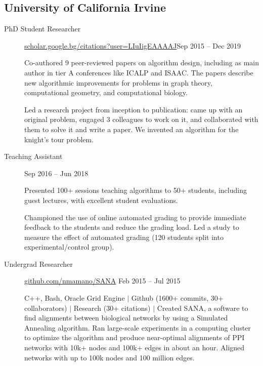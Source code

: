 \documentclass[letterpaper,10pt,oneside]{article}
\begin{document}
\subsection*{University of California Irvine}
\vspace{-3px}
\begin{description}
\item[PhD Student Researcher]\quad \href{https://scholar.google.bg/citations?hl=en&user=LIuIigEAAAAJ}{scholar.google.bg/citations?user=LIuIigEAAAAJ}\hfill Sep 2015 -- Dec 2019

Co-authored 9 peer-reviewed papers on algorithm design, including as main author in tier A conferences like ICALP and ISAAC. The papers describe new algorithmic improvements for problems in graph theory, computational geometry, and computational biology. %

\vspace{2px}
\noindent Led a research project from inception to publication: came up with an original problem, engaged 3 colleagues to work on it, and collaborated with them to solve it and write a paper. We invented an algorithm for the knight's tour problem.

\item[Teaching Assistant] \hfill Sep 2016 -- Jun 2018

Presented 100+ sessions teaching algorithms to 50+ students, including guest lectures, with excellent student evaluations.

\vspace{2px}
Championed the use of online automated grading to provide immediate feedback to the students and reduce the grading load. Led a study to measure the effect of automated grading (120 students split into experimental/control group).

\item[Undergrad Researcher]\quad \href{https://github.com/nmamano/SANA}{github.com/nmamano/SANA} \hfill Feb 2015 -- Jul 2015

C++, Bash, Oracle Grid Engine $|$ Github (1600+ commits, 30+ collaborators) $|$ Research (30+ citations) $|$ Created SANA, a software to find alignments between biological networks by using a Simulated Annealing algorithm. Ran large-scale experiments in a computing cluster to optimize the algorithm and produce near-optimal alignments of PPI networks with 10k+ nodes and 100k+ edges in about an hour. Aligned networks with up to 100k nodes and 100 million edges.
\end{description}
\end{document}
